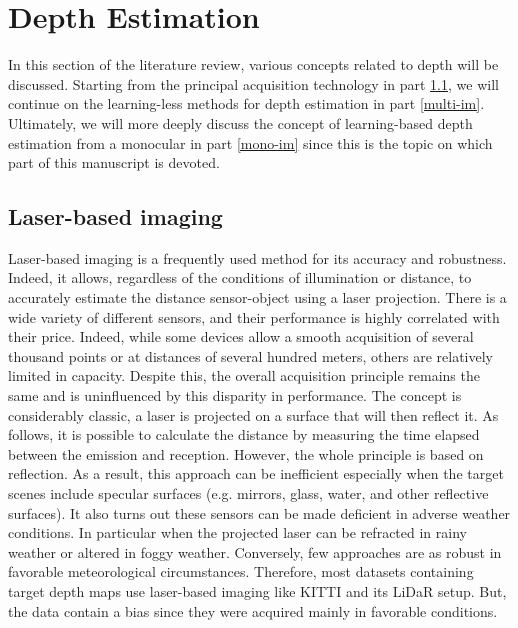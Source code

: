 \section{Depth Estimation}\label{soa-de}

In this section of the literature review, various concepts related to depth will be discussed. Starting from the principal acquisition technology in part \ref{depth-acqu}, we will continue on the learning-less methods for depth estimation in part \ref{multi-im}.
Ultimately, we will more deeply discuss the concept of learning-based depth estimation from a monocular in part \ref{mono-im} since this is the topic on which part of this manuscript is devoted.


\subsection{Laser-based imaging}\label{depth-acqu}

Laser-based imaging is a frequently used method for its accuracy and robustness. Indeed, it allows, regardless of the conditions of illumination or distance, to accurately estimate the distance sensor-object using a laser projection.
There is a wide variety of different sensors, and their performance is highly correlated with their price. Indeed, while some devices allow a smooth acquisition of several thousand points or at distances of several hundred meters, others are relatively limited in capacity. Despite this, the overall acquisition principle remains the same and is uninfluenced by this disparity in performance.
The concept is considerably classic, a laser is projected on a surface that will then reflect it. As follows, it is possible to calculate the distance by measuring the time elapsed between the emission and reception. 
However, the whole principle is based on reflection. As a result, this approach can be inefficient especially when the target scenes include specular surfaces \cite{hrabar2012evaluation} (e.g. mirrors, glass, water, and other reflective surfaces).
It also turns out these sensors can be made deficient in adverse weather conditions. In particular when the projected laser can be refracted in rainy weather or altered in foggy weather.
Conversely, few approaches are as robust in favorable meteorological circumstances. Therefore, most datasets containing target depth maps use laser-based imaging like KITTI\cite{Geiger2012CVPR,Menze2015CVPR,Fritsch2013ITSC} and its LiDaR setup. But, the data contain a bias since they were acquired mainly in favorable conditions.

